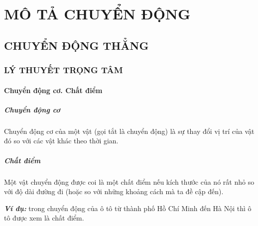 \chapter{MÔ TẢ CHUYỂN ĐỘNG}
\section{CHUYỂN ĐỘNG THẲNG}
\subsection{LÝ THUYẾT TRỌNG TÂM}
\begin{tomtat}
	\subsubsection{Chuyển động cơ. Chất điểm}
	\paragraph{Chuyển động cơ}
	\begin{dn}
		Chuyển động cơ của một vật (gọi tắt là chuyển động) là sự thay đổi vị trí của vật đó so với các vật khác theo thời gian.
	\end{dn}
	\paragraph{Chất điểm}
	\begin{dn}
		Một vật chuyển động được coi là một chất điểm nếu kích thước của nó rất nhỏ so với độ dài đường đi (hoặc so với những khoảng cách mà ta đề cập đến).
	\end{dn}
	
	\textbf{\textit{Ví dụ:}} trong chuyển động của ô tô từ thành phố Hồ Chí Minh đến Hà Nội thì ô tô được xem là chất điểm.

\end{tomtat}
